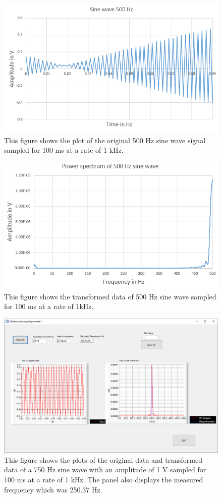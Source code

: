 \documentclass{article}
\begin{document}
\begin{figure}[H]
\includegraphics[scale=0.7,center]{SignalNyquist.PNG}
\caption{This figure shows the plot of the original 500 Hz sine wave signal sampled for 100 ms at a rate of 1 kHz.}
\end{figure}

\begin{figure}[H]
\includegraphics[scale=0.7,center]{FourierNyquist.PNG}
\caption{This figure shows the transformed data of 500 Hz sine wave sampled for 100 ms at a rate of 1kHz.}
\end{figure}

\begin{figure}[H]
\includegraphics[scale=0.4,center]{Nyquist+750.png}
\caption{This figure shows the plots of the original data and transformed data of a 750 Hz sine wave with an amplitude of 1 V sampled for 100 ms at a rate of 1 kHz.  The panel also displays the measured frequency which was 250.37 Hz.}
\end{figure}
\end{document}

